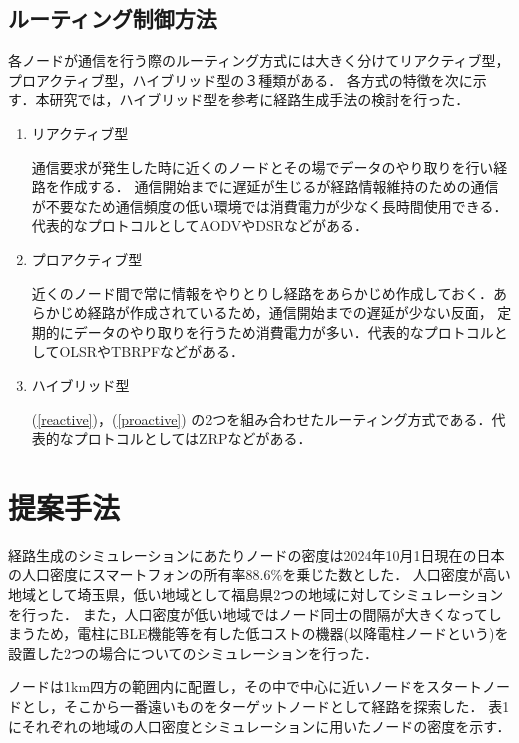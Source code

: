 \documentclass[a4paper, 9pt]{ltjsarticle}
\begin{document}
\subsection{ルーティング制御方法} \label{sublabel:routing control}
各ノードが通信を行う際のルーティング方式には大きく分けてリアクティブ型，プロアクティブ型，ハイブリッド型の３種類がある．
各方式の特徴を次に示す．本研究では，ハイブリッド型を参考に経路生成手法の検討を行った．
\begin{enumerate}
  \item \label{reactive} リアクティブ型 \par  
  \indent 通信要求が発生した時に近くのノードとその場でデータのやり取りを行い経路を作成する．
  通信開始までに遅延が生じるが経路情報維持のための通信が不要なため通信頻度の低い環境では消費電力が少なく長時間使用できる．
  代表的なプロトコルとしてAODVやDSRなどがある．

  \item \label{proactive} プロアクティブ型 \par
  \indent 近くのノード間で常に情報をやりとりし経路をあらかじめ作成しておく．あらかじめ経路が作成されているため，通信開始までの遅延が少ない反面，
  定期的にデータのやり取りを行うため消費電力が多い．代表的なプロトコルとしてOLSRやTBRPFなどがある．

  \item ハイブリッド型 \par
  \indent (\ref{reactive})，(\ref{proactive}) の2つを組み合わせたルーティング方式である．代表的なプロトコルとしてはZRPなどがある．
\end{enumerate}

\section{提案手法} \label{label:proposed method}
経路生成のシミュレーションにあたりノードの密度は2024年10月1日現在の日本の人口密度\cite{人口密度}にスマートフォンの所有率88.6\%\cite{スマホ保有率}を乗じた数とした．%
人口密度が高い地域として埼玉県，低い地域として福島県2つの地域に対してシミュレーションを行った．
また，人口密度が低い地域ではノード同士の間隔が大きくなってしまうため，電柱にBLE機能等を有した低コストの機器(以降電柱ノードという)を設置した2つの場合についてのシミュレーションを行った．\par
ノードは1km四方の範囲内に配置し，その中で中心に近いノードをスタートノードとし，そこから一番遠いものをターゲットノードとして経路を探索した．
表1にそれぞれの地域の人口密度とシミュレーションに用いたノードの密度を示す．
\end{document}
